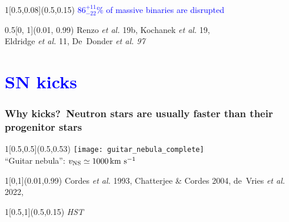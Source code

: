 \documentclass[xcolor=dvipsnames,professionalfonts, aspectratio=169]{beamer}
\begin{document}
\begin{frame}
  \begin{textblock}{1}[0.5,0.08](0.5,0.15)
    \centering\Large \textcolor{Blue}{{\Huge $86^{+11}_{-22}\%$} of massive binaries are
      disrupted}
  \end{textblock}

  \begin{textblock}{0.5}[0, 1](0.01, 0.99) \textcolor{gray!50}{\tiny
      Renzo \emph{et al.} 19b, Kochanek  \emph{et al.} 19,\\[-7pt]
      Eldridge \emph{et al.} 11, De~Donder \emph{et al. 97}}
\end{textblock}

\end{frame}


\section{\textcolor{Blue}{SN kicks}}

\begin{frame}[c]
  \frametitle{Why kicks?~Neutron stars are usually faster than their
    progenitor stars}

  \begin{textblock}{1}[0.5,0.5](0.5,0.53)
    \centering
    \texttt{[image: guitar\_nebula\_complete]}\\
    {``Guitar nebula'':  $v_{\rm NS}\simeq1000\,\mathrm{km \ s^{-1}}$}
  \end{textblock}

  \begin{textblock}{1}[0,1](0.01,0.99)
    \textcolor{gray!50}{\tiny Cordes \emph{et al.} 1993, Chatterjee
      \& Cordes 2004, de~Vries
      \emph{et al.} 2022, }
  \end{textblock}
  \begin{textblock}{1}[0.5,1](0.5,0.15)
    \centering \textcolor{gray!50}{\tiny \emph{HST}}
  \end{textblock}


\end{frame}
\end{document}
